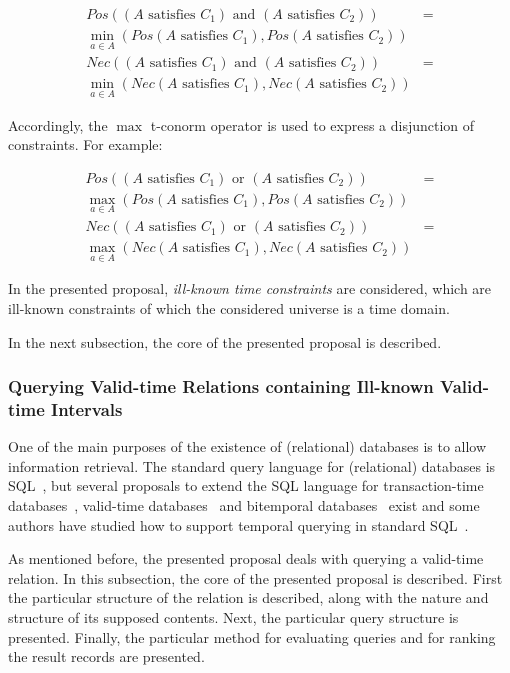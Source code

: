 \begin{align}
Pos((A\text{ satisfies }C_{1}) \text{ and } (A\text{ satisfies }C_{2})) & = \nonumber\\
 \min_{a \in A}(Pos(A\text{ satisfies }C_{1}), Pos(A\text{ satisfies }C_{2})) \nonumber \\
Nec((A\text{ satisfies }C_{1}) \text{ and } (A\text{ satisfies }C_{2})) & = \nonumber\\
 \min_{a \in A}(Nec(A\text{ satisfies }C_{1}), Nec(A\text{ satisfies }C_{2})) \nonumber
\end{align}

Accordingly, the $\max$ t-conorm operator is used to express a disjunction of constraints. For example:

\begin{align}
Pos((A\text{ satisfies }C_{1}) \text{ or } (A\text{ satisfies }C_{2})) & = \nonumber\\
 \max_{a \in A}(Pos(A\text{ satisfies }C_{1}), Pos(A\text{ satisfies }C_{2})) \nonumber \\
Nec((A\text{ satisfies }C_{1}) \text{ or } (A\text{ satisfies }C_{2})) & = \nonumber\\
 \max_{a \in A}(Nec(A\text{ satisfies }C_{1}), Nec(A\text{ satisfies }C_{2})) \nonumber
\end{align}


In the presented proposal, \emph{ill-known time constraints} are considered, which are ill-known constraints of which the considered universe is a time domain.

In the next subsection, the core of the presented proposal is described. 

\subsubsection{Querying Valid-time Relations containing Ill-known Valid-time Intervals}
\label{subsec:querying-time-intervals}

One of the main purposes of the existence of (relational) databases is to allow information retrieval. The standard query language for (relational) databases is SQL~\cite{Mel93}, but several proposals to extend the SQL language for transaction-time databases~\cite{Sarda90}, valid-time databases~\cite{gad92} and bitemporal databases~\cite{TSQL} exist and some authors have studied how to support temporal querying in standard SQL~\cite{Snodgrass98}.

As mentioned before, the presented proposal deals with querying a valid-time relation. In this subsection, the core of the presented proposal is described. First the particular structure of the relation is described, along with the nature and structure of its supposed contents. Next, the particular query structure is presented. Finally, the particular method for evaluating queries and for ranking the result records are presented.


